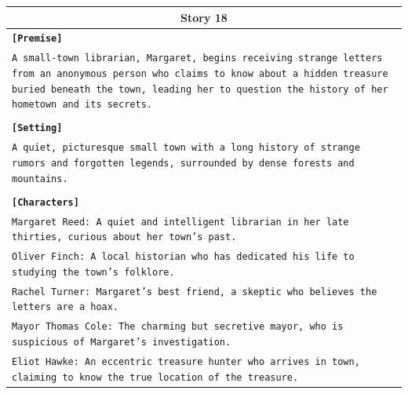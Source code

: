 \documentclass[letterpaper]{article} %
\begin{document}
\begin{small}
\begin{longtable}{p{\textwidth}}
    \multicolumn{1}{c}{\textbf{Story 18}} \\
    \midrule
    \texttt{\textbf{[Premise]}} \\
    \texttt{A small-town librarian, Margaret, begins receiving strange letters from an anonymous person who claims to know about a hidden treasure buried beneath the town, leading her to question the history of her hometown and its secrets.} \\\\
    \texttt{\textbf{[Setting]}} \\
    \texttt{A quiet, picturesque small town with a long history of strange rumors and forgotten legends, surrounded by dense forests and mountains.} \\\\
    \texttt{\textbf{[Characters]}} \\
    \texttt{Margaret Reed: A quiet and intelligent librarian in her late thirties, curious about her town's past.} \\
    \texttt{Oliver Finch: A local historian who has dedicated his life to studying the town's folklore.} \\
    \texttt{Rachel Turner: Margaret's best friend, a skeptic who believes the letters are a hoax.} \\
    \texttt{Mayor Thomas Cole: The charming but secretive mayor, who is suspicious of Margaret's investigation.} \\
    \texttt{Eliot Hawke: An eccentric treasure hunter who arrives in town, claiming to know the true location of the treasure.} \\
    \midrule


\end{longtable}
\end{small}
\end{document}
